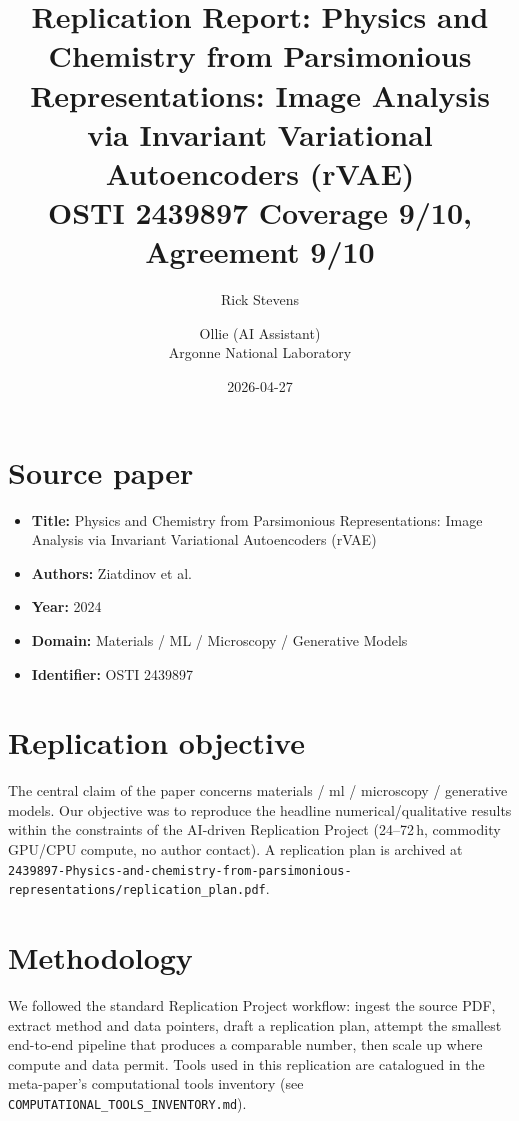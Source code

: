 \documentclass[11pt]{article}
\title{Replication Report: Physics and Chemistry from Parsimonious Representations: Image Analysis via Invariant Variational Autoencoders (rVAE)\\[2pt]\large OSTI 2439897 \textbar{} Coverage 9/10, Agreement 9/10}
\author{Rick Stevens \and Ollie (AI Assistant)\\\small Argonne National Laboratory}
\date{2026-04-27}
\begin{document}
\maketitle

\section{Source paper}
\begin{itemize}
\item \textbf{Title:} Physics and Chemistry from Parsimonious Representations: Image Analysis via Invariant Variational Autoencoders (rVAE)
\item \textbf{Authors:} Ziatdinov et al.
\item \textbf{Year:} 2024
\item \textbf{Domain:} Materials / ML / Microscopy / Generative Models
\item \textbf{Identifier:} OSTI 2439897
\end{itemize}


\section{Replication objective}
The central claim of the paper concerns materials / ml / microscopy / generative models. Our objective was to reproduce the headline numerical/qualitative results within the constraints of the AI-driven Replication Project (24--72\,h, commodity GPU/CPU compute, no author contact). A replication plan is archived at \texttt{2439897-Physics-and-chemistry-from-parsimonious-representations/replication\_plan.pdf}.

\section{Methodology}
We followed the standard Replication Project workflow: ingest the source PDF, extract method and data pointers, draft a replication plan, attempt the smallest end-to-end pipeline that produces a comparable number, then scale up where compute and data permit. Tools used in this replication are catalogued in the meta-paper's computational tools inventory (see \texttt{COMPUTATIONAL\_TOOLS\_INVENTORY.md}).
\end{document}
